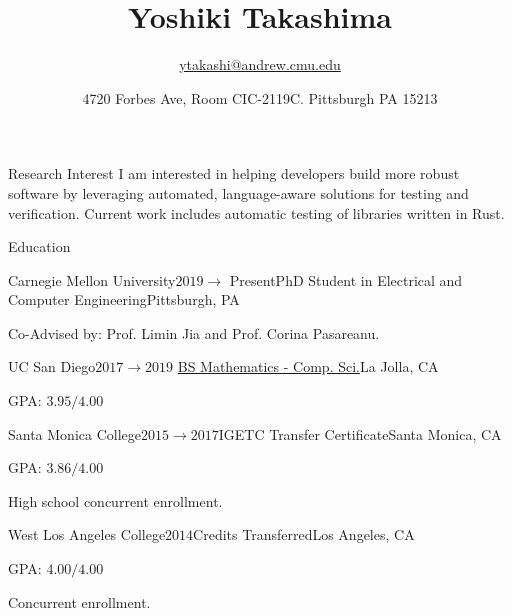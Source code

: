 \documentclass{resume} %
\title{\bf Yoshiki Takashima}
\author{\href{ytakashi@andrew.cmu.edu}{ytakashi@andrew.cmu.edu}}
\date{4720 Forbes Ave, Room CIC-2119C. Pittsburgh PA 15213}
\begin{document}
\maketitle

\begin{rSection}{Research Interest}
  I am interested in helping developers build more robust software by
  leveraging automated, language-aware solutions for testing and
  verification. Current work includes automatic testing of libraries
  written in Rust.
\end{rSection}

\begin{rSection}{Education}
  \begin{rSubsection}{Carnegie Mellon University}{$2019 \rightarrow$
      Present}{PhD Student in Electrical and Computer
      Engineering}{Pittsburgh, PA}
  \item Co-Advised by: Prof. Limin Jia and Prof. Corina Pasareanu.
  \end{rSubsection}

  \begin{rSubsection}{UC San Diego}{$2017 \rightarrow
      2019$}{
      \href{https://www.math.ucsd.edu/~handbook/undergraduate/ma30-math-computer-science-b-s/}
      {BS Mathematics - Comp. Sci.}}{La Jolla, CA}
  \item GPA: $3.95/4.00$
  \end{rSubsection}

  \begin{rSubsection}{Santa Monica College}{$2015 \rightarrow
      2017$}{IGETC Transfer Certificate}{Santa Monica, CA}
  \item GPA: $3.86/4.00$
  \item High school concurrent enrollment.
  \end{rSubsection}

  \begin{rSubsection}{West Los Angeles College}{$2014$}{Credits
      Transferred}{Los Angeles, CA}
  \item GPA: $4.00/4.00$
  \item Concurrent enrollment.
  \end{rSubsection}
\end{rSection}
\end{document}
